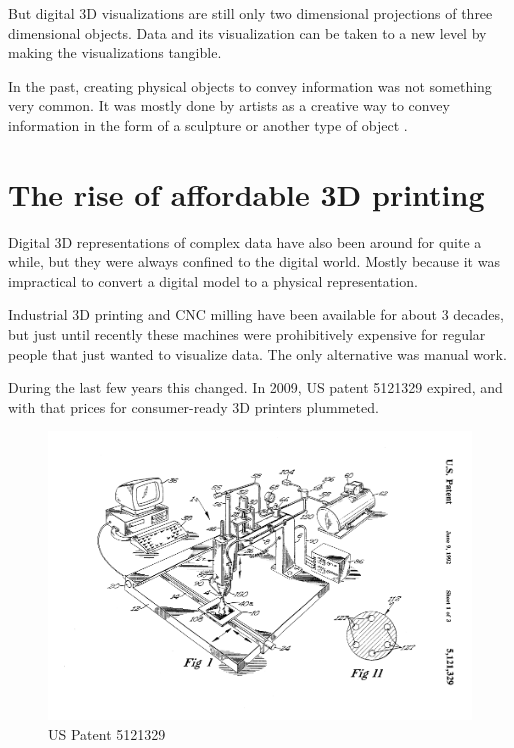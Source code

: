 But digital 3D visualizations are still only two dimensional projections of
three dimensional objects. Data and its visualization can be taken to a new
level by making the visualizations tangible.

In the past, creating physical objects to convey information was not something
very common. It was mostly done by artists as a creative way to convey
information in the form of a sculpture or another type of object
\cite{day:2009}\cite{schenker:2012}.


\section{The rise of affordable 3D printing}\label{sec:history-3dprinting}

Digital 3D representations of complex data have also been around for quite a
while\cite{marcus:2003}, but they were always confined to the digital world.
Mostly because it was impractical to convert a digital model to a physical
representation.

Industrial 3D printing and CNC milling have been available for about 3 decades,
but just until recently these machines were prohibitively expensive for regular
people that just wanted to visualize data. The only alternative was manual work.


During the last few years this changed. In 2009, US patent 5121329
\cite{us5121329:1992} expired, and with that prices for consumer-ready 3D
printers plummeted.

\begin{figure}[h]
	\centering
	\includegraphics[width=\textwidth]{images/US5121329-1.png}
	\caption{US Patent 5121329}
	\label{img:us5121329a}
\end{figure}

